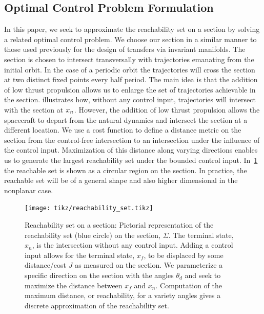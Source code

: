 \subsection{Optimal Control Problem Formulation}\label{sec:optimal_control}
In this paper, we seek to approximate the reachability set on a \Poincare section by solving a related optimal control problem. 
We choose our \Poincare section in a similar manner to those used previously for the design of transfers via invariant manifolds.
The \Poincare section is chosen to intersect transversally with trajectories emanating from the initial orbit. 
In the case of a periodic orbit the trajectories will cross the \Poincare section at two distinct fixed points every half period.
The main idea is that the addition of low thrust propulsion allows us to enlarge the set of trajectories achievable in the \Poincare section. 
 illustrates how, without any control input, trajectories will intersect with the \Poincare section at \( x_n \). 
However, the addition of low thrust propulsion allows the spacecraft to depart from the natural dynamics and intersect the \Poincare section at a different location.
We use a cost function to define a distance metric on the \Poincare section from the control-free intersection to an intersection under the influence of the control input.
Maximization of this distance along varying directions enables us to generate the largest reachability set under the bounded control input.
In~\cref{fig:reachability_set} the reachable set is shown as a circular region on the \Poincare section.
In practice, the reachable set will be of a general shape and also higher dimensional in the nonplanar case.
\begin{figure}
        \centering
        \texttt{[image: tikz/reachability\_set.tikz]}
        \caption{Reachability set on a \Poincare section: Pictorial representation of the reachability set (blue circle) on the \Poincare section, \(\Sigma\). 
            The terminal state, \( x_n\), is the intersection without any control input. 
            Adding a control input allows for the terminal state, \( x_f \), to be displaced by some distance/cost \( J \) as measured on the section.
            We parameterize a specific direction on the section with the angles \( \theta_d\) and seek to maximize the distance between \( x_f \) and \( x_n \).
            Computation of the maximum distance, or reachability, for a variety angles gives a discrete approximation of the reachability set.\label{fig:reachability_set}}
\end{figure}

